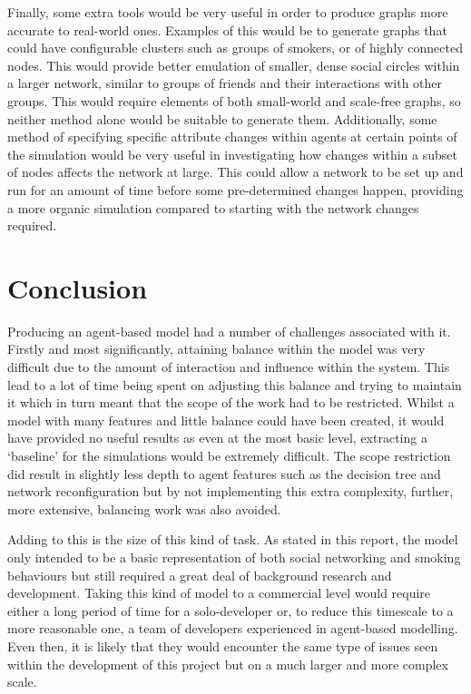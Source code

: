 \documentclass[]{report}
\begin{document}
Finally, some extra tools would be very useful in order to produce graphs more accurate to real-world ones. Examples of this would be to generate graphs that could have configurable clusters such as groups of smokers, or of highly connected nodes. This would provide better emulation of smaller, dense social circles within a larger network, similar to groups of friends and their interactions with other groups. This would require elements of both small-world and scale-free graphs, so neither method alone would be suitable to generate them. Additionally, some method of specifying specific attribute changes within agents at certain points of the simulation would be very useful in investigating how changes within a subset of nodes affects the network at large. This could allow a network to be set up and run for an amount of time before some pre-determined changes happen, providing a more organic simulation compared to starting with the network changes required.


%
%

%
%
\chapter{Conclusion}

Producing an agent-based model had a number of challenges associated with it. Firstly and most significantly, attaining balance within the model was very difficult due to the amount of interaction and influence within the system. This lead to a lot of time being spent on adjusting this balance and trying to maintain it which in turn meant that the scope of the work had to be restricted. Whilst a model with many features and little balance could have been created, it would have provided no useful results as even at the most basic level, extracting a ‘baseline’ for the simulations would be extremely difficult. The scope restriction did result in slightly less depth to agent features such as the decision tree and network reconfiguration but by not implementing this extra complexity, further, more extensive, balancing work was also avoided.

Adding to this is the size of this kind of task. As stated in this report, the model only intended to be a basic representation of both social networking and smoking behaviours but still required a great deal of background research and development. Taking this kind of model to a commercial level would require either a long period of time for a solo-developer or, to reduce this timescale to a more reasonable one, a team of developers experienced in agent-based modelling. Even then, it is likely that they would encounter the same type of issues seen within the development of this project but on a much larger and more complex scale.
\end{document}

